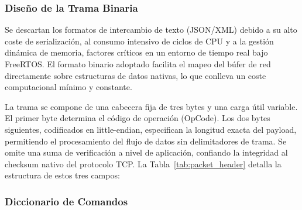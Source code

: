 \subsubsection*{Diseño de la Trama Binaria}

Se descartan los formatos de intercambio de texto (JSON/XML) debido a su alto coste de serialización, al consumo intensivo de ciclos de CPU y a la gestión dinámica de memoria, factores críticos en un entorno de tiempo real bajo FreeRTOS. El formato binario adoptado facilita el mapeo del búfer de red directamente sobre estructuras de datos nativas, lo que conlleva un coste computacional mínimo y constante.

La trama se compone de una cabecera fija de tres bytes y una carga útil variable. El primer byte determina el código de operación (OpCode). Los dos bytes siguientes, codificados en little-endian, especifican la longitud exacta del payload, permitiendo el procesamiento del flujo de datos sin delimitadores de trama. Se omite una suma de verificación a nivel de aplicación, confiando la integridad al checksum nativo del protocolo TCP. La Tabla~\ref{tab:packet_header} detalla la estructura de estos tres campos:

\begin{table}[H]
\centering
{}
\vspace{6pt}
\caption{Estructura de la cabecera de trama (\textit{Packet Header}).}
\label{tab:packet_header}
\end{table}

\subsubsection*{Diccionario de Comandos}


